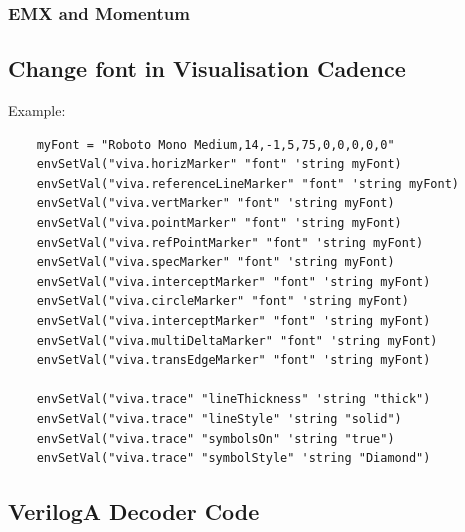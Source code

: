 \documentclass{article}
\begin{document}
\subsubsection{EMX and Momentum}


\newpage

\subsection{Change font in Visualisation Cadence}

Example:

\begin{verbatim}
	myFont = "Roboto Mono Medium,14,-1,5,75,0,0,0,0,0"
	envSetVal("viva.horizMarker" "font" 'string myFont)
	envSetVal("viva.referenceLineMarker" "font" 'string myFont)
	envSetVal("viva.vertMarker" "font" 'string myFont)
	envSetVal("viva.pointMarker" "font" 'string myFont)
	envSetVal("viva.refPointMarker" "font" 'string myFont)
	envSetVal("viva.specMarker" "font" 'string myFont)
	envSetVal("viva.interceptMarker" "font" 'string myFont)
	envSetVal("viva.circleMarker" "font" 'string myFont)
	envSetVal("viva.interceptMarker" "font" 'string myFont)
	envSetVal("viva.multiDeltaMarker" "font" 'string myFont)
	envSetVal("viva.transEdgeMarker" "font" 'string myFont)

	envSetVal("viva.trace" "lineThickness" 'string "thick")
	envSetVal("viva.trace" "lineStyle" 'string "solid")
	envSetVal("viva.trace" "symbolsOn" 'string "true")
	envSetVal("viva.trace" "symbolStyle" 'string "Diamond")
\end{verbatim}



\subsection{VerilogA Decoder Code}
\end{document}
